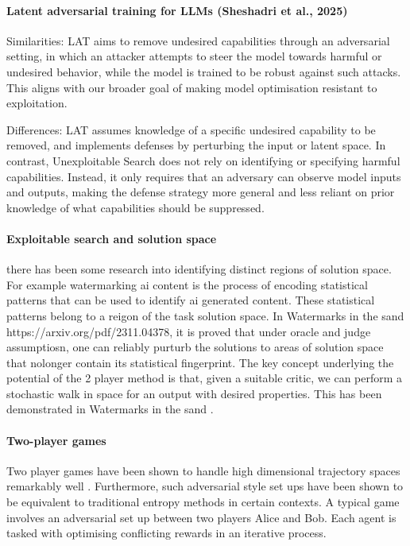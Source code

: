 \paragraph{Latent adversarial training for LLMs (Sheshadri et al., 2025) \cite{sheshadri_latent_2025}}

Similarities: LAT aims to remove undesired capabilities through an adversarial setting, in which an attacker attempts to steer the model towards harmful or undesired behavior, while the model is trained to be robust against such attacks. This aligns with our broader goal of making model optimisation resistant to exploitation.

Differences: LAT assumes knowledge of a specific undesired capability to be removed, and implements defenses by perturbing the input or latent space. In contrast, Unexploitable Search does not rely on identifying or specifying harmful capabilities. Instead, it only requires that an adversary can observe model inputs and outputs, making the defense strategy more general and less reliant on prior knowledge of what capabilities should be suppressed.

\paragraph{Exploitable search and solution space}

there has been some research into identifying distinct regions of solution space. For example watermarking ai content is the process of encoding statistical patterns that can be used to identify ai generated content. These statistical patterns belong to a reigon of the task solution space. In Watermarks in the sand https://arxiv.org/pdf/2311.04378, it is proved that under oracle and judge assumptiosn, one can reliably purturb the solutions to areas of solution space that nolonger contain its statistical fingerprint.   
The key concept underlying the potential of the 2 player method is that, given a suitable critic, we can perform a stochastic walk in space for an output with desired properties. This has been demonstrated in Watermarks in the sand \citep{zhang_watermarks_2025}. 


\paragraph{Two-player games}

Two player games have been shown to handle high dimensional trajectory spaces remarkably well \citep{finn_connection_2016,fu_learning_2018}. Furthermore, such adversarial style set ups have been shown to be equivalent to traditional entropy methods in certain contexts. A typical game involves an adversarial set up between two players Alice and Bob. Each agent is tasked with optimising conflicting rewards in an iterative process. 

